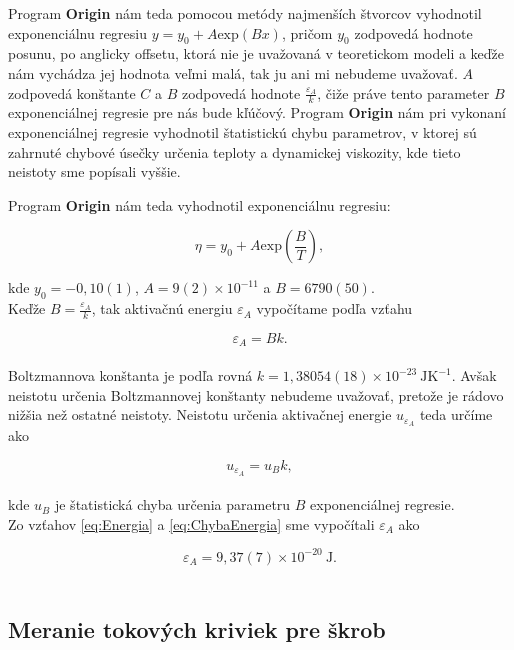\documentclass{prepareprotokol} %
\begin{document}
Program \textbf{Origin} nám teda pomocou metódy najmenších štvorcov vyhodnotil exponenciálnu regresiu
$y=y_0 + A\mathrm{exp}(Bx)$, pričom $y_0$ zodpovedá hodnote posunu, po anglicky offsetu, ktorá nie je uvažovaná v teoretickom modeli a keďže nám vychádza jej hodnota veľmi malá, tak ju ani mi nebudeme uvažovať. 
$A$ zodpovedá konštante $C$ a $B$ zodpovedá hodnote $\frac{\varepsilon_A}{k}$, čiže práve tento parameter  $B$ exponenciálnej regresie pre nás bude kľúčový.
Program \textbf{Origin} nám pri vykonaní exponenciálnej regresie vyhodnotil štatistickú chybu parametrov, v ktorej sú zahrnuté chybové úsečky určenia teploty a dynamickej viskozity, kde tieto neistoty sme popísali vyššie.

Program \textbf{Origin} nám teda vyhodnotil exponenciálnu regresiu:

\[
\eta =y_0+A\mathrm{exp}(\frac{B}{T}),
\]

kde $y_0 = -0,10(1)$, $A = 9(2)\times10^{-11}$ a $B = 6790(50)$.\\

Keďže $B = \frac{\varepsilon_A}{k}$, tak aktivačnú energiu $\varepsilon_A$ vypočítame podľa vzťahu

\begin{equation}
		\varepsilon_A = Bk.
		\label{eq:Energia}
\end{equation} \\


Boltzmannova konštanta je podľa \cite{MatFyzTabulky} rovná $k=1,38054(18)\times10^{-23}~\mathrm{JK}^{-1}$. 
Avšak neistotu určenia Boltzmannovej konštanty nebudeme uvažovať, pretože je rádovo nižšia než ostatné neistoty. Neistotu určenia aktivačnej energie $u_{\varepsilon_A}$ teda určíme ako 

\begin{equation}
		u_{\varepsilon_A} = u_Bk,
		\label{eq:ChybaEnergia}
\end{equation} \\

kde $u_B$ je štatistická chyba určenia parametru $B$ exponenciálnej regresie.\\

Zo vzťahov \ref{eq:Energia} a \ref{eq:ChybaEnergia} sme vypočítali $\varepsilon_A$ ako 

\[
\varepsilon_A = 9,37(7)\times10^{-20}~\mathrm{J}.
\]\\

\subsection*{Meranie tokových kriviek pre škrob}
\end{document}
